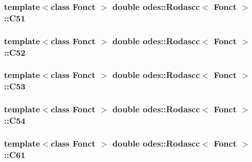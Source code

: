 \hypertarget{classodes_1_1Rodascc_ad9c08c9ec5d296b2f948f66c2136984e}{
\subsubsection[{C51}]{\setlength{\rightskip}{0pt plus 5cm}template$<$class Fonct $>$ double {\bf odes\-::\-Rodascc}$<$ Fonct $>$\-::C51\hspace{0.3cm}{\ttfamily [private]}}}\label{classodes_1_1Rodascc_ad9c08c9ec5d296b2f948f66c2136984e}
\hypertarget{classodes_1_1Rodascc_a00ebc3d1f52148b9224a42e351a98934}{
\subsubsection[{C52}]{\setlength{\rightskip}{0pt plus 5cm}template$<$class Fonct $>$ double {\bf odes\-::\-Rodascc}$<$ Fonct $>$\-::C52\hspace{0.3cm}{\ttfamily [private]}}}\label{classodes_1_1Rodascc_a00ebc3d1f52148b9224a42e351a98934}
\hypertarget{classodes_1_1Rodascc_a3dfcbf36eb559c3c830f8aabbf078df9}{
\subsubsection[{C53}]{\setlength{\rightskip}{0pt plus 5cm}template$<$class Fonct $>$ double {\bf odes\-::\-Rodascc}$<$ Fonct $>$\-::C53\hspace{0.3cm}{\ttfamily [private]}}}\label{classodes_1_1Rodascc_a3dfcbf36eb559c3c830f8aabbf078df9}
\hypertarget{classodes_1_1Rodascc_a83fc60e3076a74bd53e7b864658dfec7}{
\subsubsection[{C54}]{\setlength{\rightskip}{0pt plus 5cm}template$<$class Fonct $>$ double {\bf odes\-::\-Rodascc}$<$ Fonct $>$\-::C54\hspace{0.3cm}{\ttfamily [private]}}}\label{classodes_1_1Rodascc_a83fc60e3076a74bd53e7b864658dfec7}
\hypertarget{classodes_1_1Rodascc_a66a4056b70fa51d86d172995718bbb27}{
\subsubsection[{C61}]{\setlength{\rightskip}{0pt plus 5cm}template$<$class Fonct $>$ double {\bf odes\-::\-Rodascc}$<$ Fonct $>$\-::C61\hspace{0.3cm}{\ttfamily [private]}}}\label{classodes_1_1Rodascc_a66a4056b70fa51d86d172995718bbb27}
